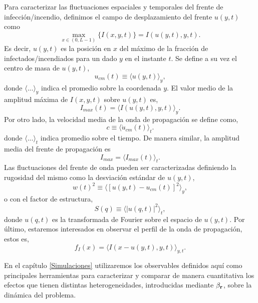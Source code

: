 Para caracterizar las fluctuaciones espaciales y temporales del frente de infección/incendio, definimos el campo de desplazamiento del frente $u(y,t)$ como
\begin{equation}
  \max_{x\in(0,L-1)}\{I(x,y,t)\}=I(u(y,t),y,t).\label{campo}
\end{equation}
Es decir, $u(y,t)$ es la posición en $x$ del máximo de la fracción de infectados/incendiados para un dado $y$ en el instante $t$. Se define a su vez el centro de masa
de $u(y,t)$,
\begin{equation}
  u_{cm}(t)\equiv\langle u(y,t)\rangle_{y},\label{centromasa}
\end{equation}
donde $\langle...\rangle_{y}$ indica el promedio sobre la coordenada $y$. El valor medio de la amplitud máxima de $I(x,y,t)$ sobre $u(y,t)$ es,
\begin{equation}
  I_{max}(t)=\langle I(u(y,t),y,t)\rangle_{y}.\label{maximo}
\end{equation}
Por otro lado, la velocidad media de la onda de propagación se define como,
\begin{equation}
  c\equiv\langle\dot{u}_{cm}(t)\rangle_{t}.\label{velocidad}
\end{equation}
donde $\langle...\rangle_{t}$ indica promedio sobre el tiempo. De manera similar, la amplitud media del frente de propagación es
\begin{equation}
  I_{max}=\langle I_{max}(t)\rangle_{t}.  \label{Imax}
\end{equation} 
Las fluctuaciones del frente de onda pueden ser caracterizadas definiendo la rugosidad del mismo como la desviación estándar de $u(y,t)$,
\begin{equation}
  w(t)^2\equiv\langle[u(y,t)-u_{cm}(t)]^2\rangle_{y},\label{rugosidad}
\end{equation}  
o con el factor de estructura,
\begin{equation}
  S(q)\equiv\langle|u(q,t)|^2\rangle_{t},\label{factor}
\end{equation}
donde $u(q,t)$ es la transformada de Fourier sobre el espacio de $u(y,t)$.
Por último, estaremos interesados en observar el perfil de la onda de propagación, estos es,
\begin{equation}
  f_{I}(x)=\langle I(x-u(y,t),y,t)\rangle_{y,t}.\label{perfil}
\end{equation}

En el capítulo \ref{Simulaciones} utilizaremos los observables definidos aquí como principales herramientas para caracterizar y comparar de manera cuantitativa
los efectos que tienen distintas heterogeneidades, introducidas mediante $\beta_{\vb r}$, sobre la dinámica del problema. 







